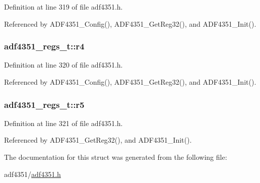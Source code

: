 Definition at line 319 of file adf4351.\+h.



Referenced by A\+D\+F4351\+\_\+\+Config(), A\+D\+F4351\+\_\+\+Get\+Reg32(), and A\+D\+F4351\+\_\+\+Init().

\subsubsection[{\texorpdfstring{r4}{r4}}]{ adf4351\+\_\+regs\+\_\+t\+::r4}\hypertarget{structadf4351__regs__t_a343af9ab05747dd9b977603d02ebb4df}{}\label{structadf4351__regs__t_a343af9ab05747dd9b977603d02ebb4df}


Definition at line 320 of file adf4351.\+h.



Referenced by A\+D\+F4351\+\_\+\+Config(), A\+D\+F4351\+\_\+\+Get\+Reg32(), and A\+D\+F4351\+\_\+\+Init().

\subsubsection[{\texorpdfstring{r5}{r5}}]{ adf4351\+\_\+regs\+\_\+t\+::r5}\hypertarget{structadf4351__regs__t_ab0bd52a2f47aa3f45d0aa97136ec6e8c}{}\label{structadf4351__regs__t_ab0bd52a2f47aa3f45d0aa97136ec6e8c}


Definition at line 321 of file adf4351.\+h.



Referenced by A\+D\+F4351\+\_\+\+Get\+Reg32(), and A\+D\+F4351\+\_\+\+Init().



The documentation for this struct was generated from the following file\+:\begin{DoxyCompactItemize}
\item 
adf4351/\hyperlink{adf4351_8h}{adf4351.\+h}\end{DoxyCompactItemize}
